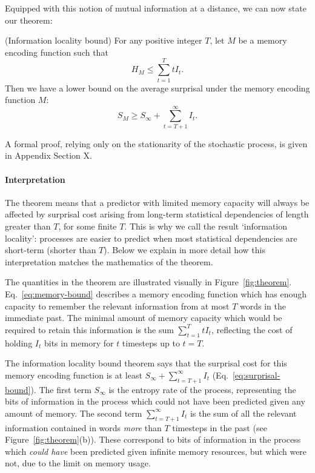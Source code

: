 Equipped with this notion of mutual information at a distance, we can now state our theorem:
\begin{thm}\label{prop:suboptimal}(Information locality bound) For any positive integer $T$, let $M$ be a memory encoding function such that
\begin{equation}
\label{eq:memory-bound}
H_M \le \sum_{t=1}^T t I_t.    
\end{equation}
Then we have a lower bound on the average surprisal under the memory encoding function $M$:
\begin{equation}
\label{eq:surprisal-bound}
S_M \ge S_\infty + \sum_{t=T+1}^\infty I_t.
\end{equation}
\end{thm}
A formal proof, relying only on the stationarity of the stochastic process, is given in Appendix Section X. 

\paragraph{Interpretation} The theorem means that a predictor with limited memory capacity will always be affected by surprisal cost arising from long-term statistical dependencies of length greater than $T$, for some finite $T$. This is why we call the result `information locality': processes are easier to predict when most statistical dependencies are short-term (shorter than $T$). Below we explain in more detail how this interpretation matches the mathematics of the theorem.

The quantities in the theorem are illustrated visually in Figure~\ref{fig:theorem}. Eq.~\ref{eq:memory-bound} describes a memory encoding function which has enough capacity to remember the relevant information from at most $T$ words in the immediate past. The minimal amount of memory capacity which would be required to retain this information is the sum $\sum_{t=1}^T t I_t$, reflecting the cost of holding $I_t$ bits in memory for $t$ timesteps up to $t=T$. 

The information locality bound theorem says that the surprisal cost for this memory encoding function is at least $S_\infty + \sum_{t=T+1}^\infty I_t$ (Eq.~\ref{eq:surprisal-bound}). The first term $S_\infty$ is the entropy rate of the process, representing the bits of information in the process which could not have been predicted given any amount of memory. The second term $\sum_{t=T+1}^\infty I_t$ is the sum of all the relevant information contained in words \emph{more} than $T$ timesteps in the past (see Figure~\ref{fig:theorem}(b)). These correspond to bits of information in the process which \emph{could have} been predicted given infinite memory resources, but which were not, due to the limit on memory usage.

